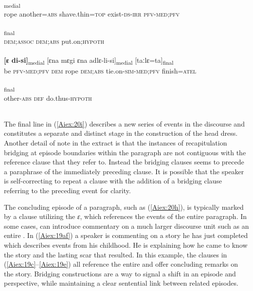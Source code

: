 \documentclass[output=paper]{LSP/langsci}
\begin{document}
\begin{exe}
\begin{xlist}
\ex \label{Aiex:20f}
\textsubscript{medial}\\
rope	another\textsc{=abs}	shave.thin\textsc{=top}	exist\textsc{-ds-irr}	\textsc{pfv-med;pfv}\\
\glt {}\\
\ex \label{Aiex:20g}
\textsubscript{final}\\
\textsc{dem;assoc}	\textsc{dem;abs}	put.on\textsc{;hypoth}\\
\glt {}\\
\ex \label{Aiex:20h}
\gll \textbf{[ɛ	di-si]}\textsubscript{medial}	[ɛna	mɛgi	ɛna	adlɛ-li-si]\textsubscript{medial}	[taːlɛ=ta]\textsubscript{final}\\
be	\textsc{pfv-med;pfv}	\textsc{dem}	rope	\textsc{dem;abs}	tie.on\textsc{-sim-med;pfv}	finish\textsc{=atel}\\
\glt {}\\
\ex \label{Aiex:20i}
\textsubscript{final}\\
other\textsc{-abs}	\textsc{def}	do.thus\textsc{-hypoth}\\
\glt {}\\
\end{xlist}
\end{exe}

	The final line in (\ref{Aiex:20i}) describes a new series of events in the discourse and constitutes a separate and distinct stage in the construction of the head dress. Another detail of note in the extract is that the instances of recapitulation bridging at episode boundaries within the paragraph are not contiguous with the reference clause that they refer to. Instead the bridging clauses seems to precede a paraphrase of the immediately preceding clause. It is possible that the speaker is self-correcting to repeat a clause with the addition of a bridging clause referring to the preceding event for clarity.
	

	The concluding episode of a paragraph, such as (\ref{Aiex:20h}), is typically marked by a  clause utilizing the  \textit{ɛ}, which references the events of the entire paragraph. In some cases,  can introduce commentary on a much larger discourse unit such as an entire . In (\ref{Aiex:19af}) a speaker is commenting on a story he has just completed which describes events from his childhood. He is explaining how he came to know the story and the lasting scar that resulted. In this example, the  clauses in (\ref{Aiex:19c}--\ref{Aiex:19e}) all reference the entire  and offer concluding remarks on the story. Bridging constructions are a way to signal a shift in an episode and perspective, while maintaining a clear sentential link between related episodes. 
	
\end{document}
